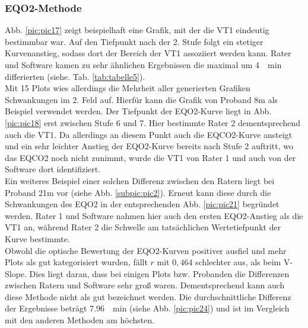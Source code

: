 \subsubsection{\acs{EQO2}-Methode}
%
Abb. \ref{pic:pic17} zeigt beispielhaft eine Grafik, mit der die VT1 eindeutig bestimmbar war. Auf den Tiefpunkt nach der 2. Stufe folgt ein stetiger Kurvenanstieg, sodass dort der Bereich der VT1 assoziiert werden kann. Rater und Software kamen zu sehr ähnlichen Ergebnissen die maximal um \SI{4}{\per\minute} differierten (siehe. Tab. \ref{tab:tabelle5}).\\
Mit 15 Plots wies allerdings die Mehrheit aller generierten Grafiken Schwankungen im 2. Feld auf. Hierfür kann die Grafik von Proband 8m als Beispiel verwendet werden. Der Tiefpunkt der \acs{EQO2}-Kurve liegt in Abb. \ref{pic:pic18} erst zwischen Stufe 6 und 7. Hier bestimmte Rater 2 dementsprechend auch die VT1. Da allerdings an diesem Punkt auch die \acs{EQCO2}-Kurve ansteigt und ein sehr leichter Anstieg der \acs{EQO2}-Kurve bereits nach Stufe 2 auftritt, wo das \acs{EQCO2} noch nicht zunimmt, wurde die VT1 von Rater 1 und auch von der Software dort identifiziert.\\
Ein weiteres Beispiel einer solchen Differenz zwischen den Ratern liegt bei Proband 21m vor (siehe Abb. \ref{subpic:pic2}). Erneut kann diese durch die Schwankungen des \acs{EQO2} in der entsprechenden Abb. \ref{pic:pic21} begründet werden. Rater 1 und Software nahmen hier auch den ersten \acs{EQO2}-Anstieg als die VT1 an, während Rater 2 die Schwelle am tatsächlichen Wertetiefpunkt der Kurve bestimmte.\\
Obwohl die optische Bewertung der \acs{EQO2}-Kurven positiver ausfiel und mehr Plots als gut kategorisiert wurden, fällt $r$ mit $0,464$ schlechter aus, als beim V-Slope. Dies liegt daran, dass bei einigen Plots bzw. Probanden die Differenzen zwischen Ratern und Software sehr groß waren. Dementsprechend kann auch diese Methode nicht als gut bezeichnet werden. Die durchschnittliche Differenz der Ergebnisse beträgt \SI{7,96}{\per\minute} (siehe Abb. \ref{pic:pic24}) und ist im Vergleich mit den anderen Methoden am höchsten.
%

